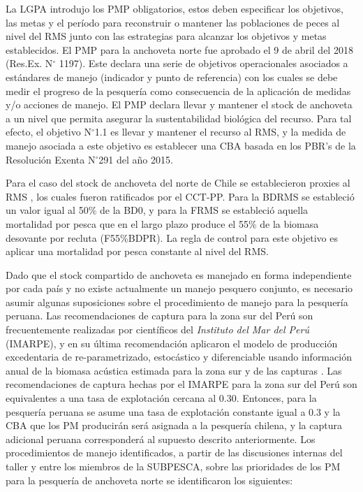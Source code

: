
La LGPA introdujo los PMP obligatorios, estos deben especificar los objetivos, las metas y el período para reconstruir o mantener las poblaciones de peces al nivel del RMS junto con las estrategias para alcanzar los objetivos y metas establecidos. El PMP para la anchoveta norte fue aprobado el 9 de abril del 2018 (Res.Ex. N$^\circ$ 1197). Este declara una serie de objetivos operacionales asociados a estándares de manejo (indicador y punto de referencia) con los cuales se debe medir el progreso de la pesquería como consecuencia de la aplicación de medidas y/o acciones de manejo. El PMP declara llevar y mantener el stock de anchoveta a un nivel que permita asegurar la sustentabilidad biológica del recurso. Para tal efecto, el objetivo N$^\circ$1.1 es llevar y mantener el recurso al RMS, y la medida de manejo asociada a este objetivo es establecer una CBA basada en los PBR's  de la Resolución Exenta N$^\circ$291 del año 2015.
\newline

Para el caso del stock de anchoveta del norte de Chile se establecieron proxies al RMS \citep{Paya2014}, los cuales fueron ratificados por el CCT-PP. Para la BDRMS se estableció un valor igual al 50\% de la BD0, y para la FRMS se estableció aquella mortalidad por pesca que en el largo plazo produce el 55\% de la biomasa desovante por recluta (F55\%BDPR). La regla de control para este objetivo es aplicar una mortalidad por pesca constante al nivel del RMS.
\newline

Dado que el stock compartido de anchoveta es manejado en forma independiente por cada país y no existe actualmente un manejo pesquero conjunto, es necesario asumir algunas suposiciones sobre el procedimiento de manejo para la pesquería peruana. Las recomendaciones de captura para la zona sur del Perú son frecuentemente realizadas por científicos del \textit{Instituto del Mar del Perú} (IMARPE), y en su última recomendación aplicaron el modelo de producción excedentaria de \cite{jj1969generalized} re-parametrizado, estocástico y diferenciable usando información anual de la biomasa acústica estimada para la zona sur y de las capturas \citep{produce2021}. Las recomendaciones de captura hechas por el IMARPE para la zona sur del Perú son equivalentes a una tasa de explotación cercana al 0.30. Entonces, para la pesquería peruana se asume una tasa de explotación constante igual a 0.3 y la CBA que los PM producirán será asignada a la pesquería chilena, y la captura adicional peruana corresponderá al supuesto descrito anteriormente. Los procedimientos de manejo identificados, a partir de las discusiones internas del taller y entre los miembros de la SUBPESCA, sobre las prioridades de los PM para la pesquería de anchoveta norte se identificaron los siguientes:  

